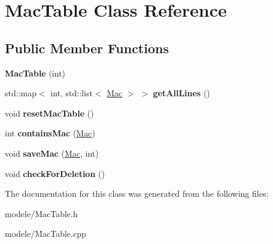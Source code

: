 \hypertarget{class_mac_table}{\section{Mac\-Table Class Reference}
\label{class_mac_table}
}
\subsection*{Public Member Functions}
\begin{DoxyCompactItemize}
\item 
\hypertarget{class_mac_table_a831693f4080c5dd745e0f994e5083d74}{{\bfseries Mac\-Table} (int)}\label{class_mac_table_a831693f4080c5dd745e0f994e5083d74}

\item 
\hypertarget{class_mac_table_a20420a6149289b72e851c96500a68ea7}{std\-::map$<$ int, std\-::list$<$ \hyperlink{class_mac}{Mac} $>$ $>$ {\bfseries get\-All\-Lines} ()}\label{class_mac_table_a20420a6149289b72e851c96500a68ea7}

\item 
\hypertarget{class_mac_table_a098522b3eab272bbb6d63bc6530047b7}{void {\bfseries reset\-Mac\-Table} ()}\label{class_mac_table_a098522b3eab272bbb6d63bc6530047b7}

\item 
\hypertarget{class_mac_table_a1c9ebac7befdef3a59dc82da6e21bfa6}{int {\bfseries contains\-Mac} (\hyperlink{class_mac}{Mac})}\label{class_mac_table_a1c9ebac7befdef3a59dc82da6e21bfa6}

\item 
\hypertarget{class_mac_table_af105c043ecfff1612539a916a1cf3390}{void {\bfseries save\-Mac} (\hyperlink{class_mac}{Mac}, int)}\label{class_mac_table_af105c043ecfff1612539a916a1cf3390}

\item 
\hypertarget{class_mac_table_a1eb7fdae9835057fcad0ed43f1f2bc9e}{void {\bfseries check\-For\-Deletion} ()}\label{class_mac_table_a1eb7fdae9835057fcad0ed43f1f2bc9e}

\end{DoxyCompactItemize}


The documentation for this class was generated from the following files\-:\begin{DoxyCompactItemize}
\item 
modele/Mac\-Table.\-h\item 
modele/Mac\-Table.\-cpp\end{DoxyCompactItemize}
